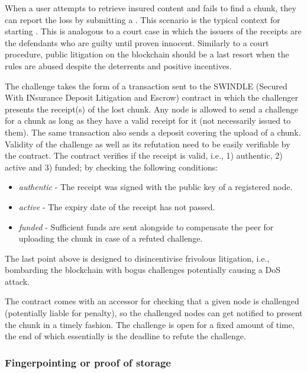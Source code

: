 When a user attempts to retrieve insured content and fails to find a chunk, they can report the loss by submitting a . This scenario is the typical context for starting . This is analogous to a court case in which the issuers of the receipts are the defendants who are guilty until proven innocent. Similarly to a court procedure, public litigation on the blockchain should be a last resort when the rules are abused despite the deterrents and positive incentives.


The challenge takes the form of a transaction sent to the SWINDLE (Secured With INsurance Deposit Litigation and Escrow) contract in which the challenger presents the receipt(s) of the lost chunk. Any node is allowed to send a challenge for a chunk as long as they have a valid receipt for it (not necessarily issued to them). The same transaction also sends a deposit covering the upload of a chunk. Validity of the challenge as well as its refutation need to be easily verifiable by the contract.
The contract verifies if the receipt is valid, i.e., 1) authentic, 2) active and 3) funded; by checking the following conditions:

\begin{itemize}
\item \emph{authentic} - The receipt was signed with the public key of a registered node.
\item \emph{active} - The expiry date of the receipt has not passed.
\item \emph{funded} - Sufficient funds are sent alongside to compensate the peer for uploading the chunk in case of a refuted challenge.
\end{itemize}

The last point above is designed to disincentivise frivolous litigation, i.e., bombarding the blockchain with bogus challenges potentially causing a DoS attack.

The contract comes with an accessor for checking that a given node is challenged (potentially liable for penalty), so the challenged nodes can get notified to present the chunk in a timely fashion. The challenge is open for a fixed amount of time, the end of which essentially is the deadline to refute the challenge. 


\subsubsection{Fingerpointing or proof of storage}


